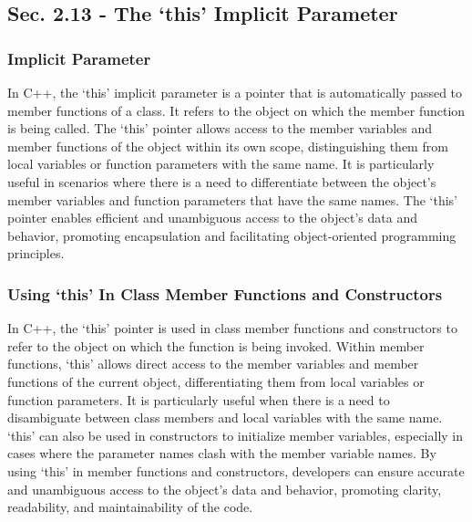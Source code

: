 \subsection*{Sec. 2.13 - The `this' Implicit Parameter}
\subsubsection*{Implicit Parameter}

In C++, the `this' implicit parameter is a pointer that is automatically passed to member functions of a class. It refers to the object on which the member function is being called. The `this' pointer allows access to the member variables and member functions of the object within its own scope, 
distinguishing them from local variables or function parameters with the same name. It is particularly useful in scenarios where there is a need to differentiate between the object's member variables and function parameters that have the same names. The `this' pointer enables efficient and unambiguous 
access to the object's data and behavior, promoting encapsulation and facilitating object-oriented programming principles.

\subsubsection*{Using `this' In Class Member Functions and Constructors}

In C++, the `this' pointer is used in class member functions and constructors to refer to the object on which the function is being invoked. Within member functions, `this' allows direct access to the member variables and member functions of the current object, differentiating them from local variables 
or function parameters. It is particularly useful when there is a need to disambiguate between class members and local variables with the same name. `this' can also be used in constructors to initialize member variables, especially in cases where the parameter names clash with the member variable names. 
By using `this' in member functions and constructors, developers can ensure accurate and unambiguous access to the object's data and behavior, promoting clarity, readability, and maintainability of the code.

